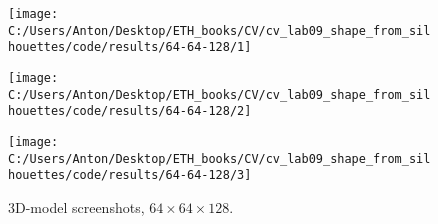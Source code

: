 \documentclass{report}
\begin{document}
	\begin{figure}[h]
		\begin{center}
			\label{tang1}
			\begin{minipage}[h]{0.29\linewidth}
				\texttt{[image: C:/Users/Anton/Desktop/ETH\_books/CV/cv\_lab09\_shape\_from\_silhouettes/code/results/64-64-128/1]}
			\end{minipage}
			\hfill
			\begin{minipage}[h]{0.29\linewidth}
				\texttt{[image: C:/Users/Anton/Desktop/ETH\_books/CV/cv\_lab09\_shape\_from\_silhouettes/code/results/64-64-128/2]}
			\end{minipage}
				\hfill
				\begin{minipage}[h]{0.29\linewidth}
					\texttt{[image: C:/Users/Anton/Desktop/ETH\_books/CV/cv\_lab09\_shape\_from\_silhouettes/code/results/64-64-128/3]}
			\end{minipage}

			
		\caption{3D-model screenshots, $64\times64\times128$.}
	\end{center}
\end{figure}
\end{document}
